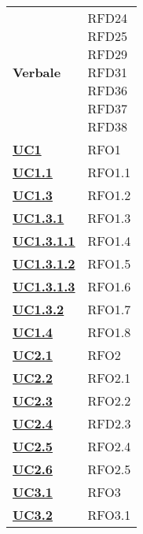 \begin{longtable}[H]{| >{\centering\bfseries}p{8cm} | >{\centering\arraybackslash}p{8cm} |}
    Verbale & 
        \makecell{
            RFD24 \\
            RFD25 \\
            RFD29 \\
            RFD31 \\
            RFD36 \\
            RFD37 \\
            RFD38
        } \\

    \hyperref[sub:uc1]{UC1} & RFO1 \\

    \hyperref[ssub:uc1.1]{UC1.1} & RFO1.1 \\

    \hyperref[ssub:uc1.3]{UC1.3} & RFO1.2 \\

    \hyperref[par:uc1.3.1]{UC1.3.1} & RFO1.3 \\

    \hyperref[spar:uc1.3.1.1]{UC1.3.1.1} & RFO1.4 \\

    \hyperref[spar:uc1.3.1.2]{UC1.3.1.2} & RFO1.5 \\

    \hyperref[spar:uc1.3.1.3]{UC1.3.1.3} & RFO1.6 \\

    \hyperref[par:uc1.3.2]{UC1.3.2} & RFO1.7 \\

    \hyperref[ssub:uc1.4]{UC1.4} & RFO1.8 \\

    \hyperref[ssub:uc2.1]{UC2.1} & RFO2 \\

    \hyperref[ssub:uc2.2]{UC2.2} & RFO2.1 \\

    \hyperref[ssub:uc2.3]{UC2.3} & RFO2.2 \\

    \hyperref[ssub:uc2.4]{UC2.4} & RFD2.3 \\

    \hyperref[ssub:uc2.5]{UC2.5} & RFO2.4 \\

    \hyperref[ssub:UC2.6]{UC2.6} & RFO2.5 \\

    \hyperref[ssub:uc3.1]{UC3.1} & RFO3 \\

    \hyperref[ssub:uc3.2]{UC3.2} & RFO3.1 \\


\end{longtable}
